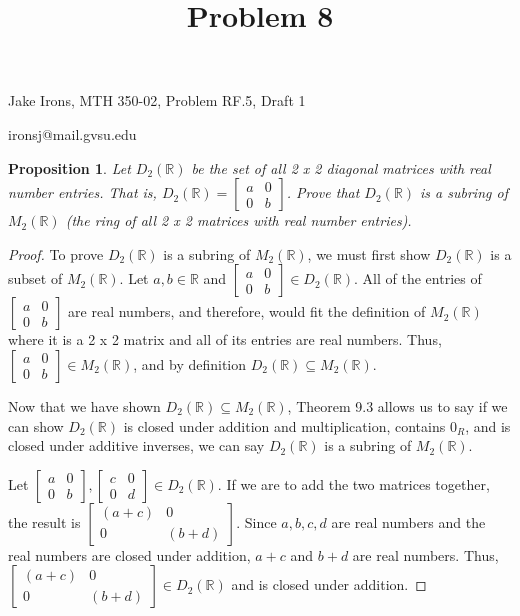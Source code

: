 \documentclass[11 pt]{article}
\title{Problem 8}
\newtheorem{proposition}{Proposition}
\newcommand{\newpar}{\vspace{.15in}\noindent}
\begin{document}
\noindent Jake Irons, MTH 350-02, Problem RF.5, Draft 1

\noindent ironsj@mail.gvsu.edu

\newpar
\begin{proposition}
Let $D_2(\mathbb{R})$ be the set of all 2 x 2 diagonal matrices with real number entries. That is, $D_2(\mathbb{R})= \begin{bmatrix}
    a & 0 \\
    0 & b
  \end{bmatrix}$. Prove that $D_2(\mathbb{R})$ is a subring of $M_2(\mathbb{R})$ (the ring of all 2 x 2 matrices with real number entries).
\end{proposition}
\begin{proof}
To prove $D_2(\mathbb{R})$ is a subring of $M_2(\mathbb{R})$, we must first show $D_2(\mathbb{R})$ is a subset of $M_2(\mathbb{R})$. Let $a, b \in \mathbb{R}$ and $\begin{bmatrix}
    a & 0 \\
    0 & b
  \end{bmatrix}\in D_2(\mathbb{R})$. All of the entries of $\begin{bmatrix}
    a & 0 \\
    0 & b
  \end{bmatrix}$ are real numbers, and therefore, would fit the definition of $M_2(\mathbb{R})$ where it is a 2 x 2 matrix and all of its entries are real numbers. Thus, $\begin{bmatrix}
    a & 0 \\
    0 & b
  \end{bmatrix} \in M_2(\mathbb{R})$, and by definition $D_2(\mathbb{R}) \subseteq M_2(\mathbb{R})$.
  
  \newpar
  Now that we have shown $D_2(\mathbb{R}) \subseteq M_2(\mathbb{R})$, Theorem 9.3 allows us to say if we can show $D_2(\mathbb{R})$ is closed under addition and multiplication, contains $0_R$, and is closed under additive inverses, we can say $D_2(\mathbb{R})$ is a subring of $M_2(\mathbb{R})$.
  
  \newpar
  Let $\begin{bmatrix}
    a & 0 \\
    0 & b
  \end{bmatrix}, \begin{bmatrix}
    c & 0 \\
    0 & d
  \end{bmatrix} \in D_2(\mathbb{R})$. If we are to add the two matrices together, the result is $\begin{bmatrix}
    (a+c) & 0 \\
    0 & (b+d)
  \end{bmatrix}$. Since $a, b, c, d$ are real numbers and the real numbers are closed under addition, $a+c$ and $b+d$ are real numbers. Thus, $\begin{bmatrix}
    (a+c) & 0 \\
    0 & (b+d)
  \end{bmatrix}\in D_2(\mathbb{R})$ and is closed under addition.
  

\end{proof}
\end{document}
